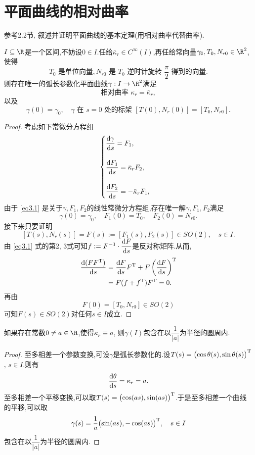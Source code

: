 \section{平面曲线的相对曲率}
\begin{excise}
		参考2.2节, 叙述并证明平面曲线的基本定理(用相对曲率代替曲率).
	\end{excise}
	\begin{thm*}[平面曲线基本定理]
		$I\subseteq \R$是一个区间,不妨设$0\in I$.任给$\bar{\kappa}_{r}\in C^{\infty}(I)$,再任给常向量$\gamma_{0},T_{0},N_{r0}\in\R^{2}$,使得
		$$
		T_{0}\text{ 是单位向量},N_{r0}\text{ 是\ }T_{0}\text{ 逆时针旋转\ }\frac{\pi}{2}\text{ 得到的向量}.
		$$
		则存在唯一的弧长参数化平面曲线$\gamma: I\to\R^{2}$满足
		$$
		\text{相对曲率\ }\kappa_{r}=\bar{\kappa}_{r},
		$$
		以及
		$$
		\gamma(0)=\gamma_{0},\quad \gamma\text{ 在\ }s=0\text{ 处的标架\ }[T(0),N_{r}(0)]=[T_{0},N_{r0}].
		$$
	\end{thm*}
	\begin{proof}
		考虑如下常微分方程组
		\begin{equation}\label{eq3.1}
			\begin{cases}
				\dfrac{\mathrm{d} \gamma}{\mathrm{d} s} = F_{1},\\\\
				\dfrac{\mathrm{d} F_{1}}{\mathrm{d} s} = \bar{\kappa}_{r}F_{2},\\\\
				\dfrac{\mathrm{d} F_{2}}{\mathrm{d} s} = -\bar{\kappa}_{r}F_{1},
			\end{cases}
		\end{equation}
		由于 \eqref{eq3.1} 是关于$\gamma, F_{1}, F_{2}$的线性常微分方程组,存在唯一解$\gamma, F_{1}, F_{2}$满足
		$$
		\gamma(0)=\gamma_{0},\quad F_{1}(0)=T_{0},\quad F_{2}(0)=N_{r0}.
		$$
		接下来只要证明
		$$
		[T(s),N_{r}(s)]=F(s):=[F_{1}(s),F_{2}(s)]\in SO(2),\quad s\in I.
		$$
		由 \eqref{eq3.1} 式的第2, 3式可知$f:=F^{-1}\cdot\dfrac{\mathrm{d} F}{\mathrm{d} s}$是反对称矩阵.从而,
		\begin{align*}
			\frac{\mathrm{d} (FF^{\mathrm{T}})}{\mathrm{d} s}&=\frac{\mathrm{d} F}{\mathrm{d} s}F^{\mathrm{T}}+F\left(\frac{\mathrm{d} F}{\mathrm{d} s}\right)^{\mathrm{T}}\\
			&=F(f+f^{\mathrm{T}})F^{\mathrm{T}}=0.
		\end{align*}
		再由
		$$
		F(0)=[T_{0},N_{r0}]\in SO(2)
		$$
		可知$F(s)\in SO(2)$对任何$s\in I$成立.
	\end{proof}

	\begin{excise}
		如果存在常数$0\neq a \in \R$,使得$\kappa_{r}\equiv a$,
		则$\gamma(I)$包含在以$\dfrac{1}{|a|}$为半径的圆周内.
	\end{excise}
	\begin{proof}
		至多相差一个参数变换,可设$\gamma$是弧长参数化的.设$T(s)=\bigl(\cos\theta(s),\sin\theta(s)\bigr)^{\mathrm{T}}$, $s\in I$.则有
		$$
		\frac{\mathrm{d} \theta}{\mathrm{d} s}=\kappa_{r}=a.
		$$
		至多相差一个平移变换,可以取$T(s)=\bigl(\cos(as),\sin(as)\bigr)^{\mathrm{T}}$.于是至多相差一个曲线的平移,可以取
		$$
		\gamma(s)=\dfrac{1}{a}\bigl(\sin(as),-\cos(as)\bigr)^{\mathrm{T}},\quad s\in I
		$$
		包含在以$\dfrac{1}{|a|}$为半径的圆周内.
	\end{proof}

